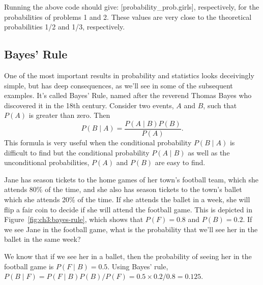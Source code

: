 Running the above code should give:
[probability_prob.girls],
respectively, for the probabilities of problems 1 and 2. These values are very
close to the theoretical probabilities 1/2 and 1/3, respectively.






\subsection{Bayes' Rule}\label{sec:Bayes}
One of the most important results in probability and statistics looks
deceivingly simple, but has deep consequences, as we'll see in some of the
subsequent examples. It's called Bayes' Rule, named after the reverend Thomas
Bayes who discovered it in the 18th century. Consider two events, $A$ and $B$,
such that $P(A)$ is greater than zero. Then
\begin{equation}\label{eq:bayes}
  P(B\mid A) = \frac{P(A\mid B)P(B)}{P(A)}.
\end{equation}
This formula is very useful when the conditional probability $P(B\mid A)$ is
difficult to find but the conditional probability $P(A\mid B)$ as well as the
unconditional probabilities, $P(A)$ and $P(B)$ are easy to find.

\begin{example}
Jane has season tickets to the home games of her town's football team, which she
attends 80\% of the time, and she also has season tickets to the town's ballet
which she attends 20\% of the time. If she attends the ballet in a week, she
will flip a fair coin to decide if she will attend the football game.
This is depicted in Figure~\ref{fig:ch3:bayes-rule}, which shows that $P(F)=0.8$ and
$P(B)=0.2$. If we see Jane in the football game, what is the probability that
we'll see her in the ballet in the same week?

\end{example}

We know that if we see her in a ballet, then the probability of seeing her in
the football game is $P(F \mid B)=0.5$. Using Bayes' rule,
$P(B\mid F) = P(F\mid B)P(B)/P(F) =0.5\times0.2/0.8=0.125$.

